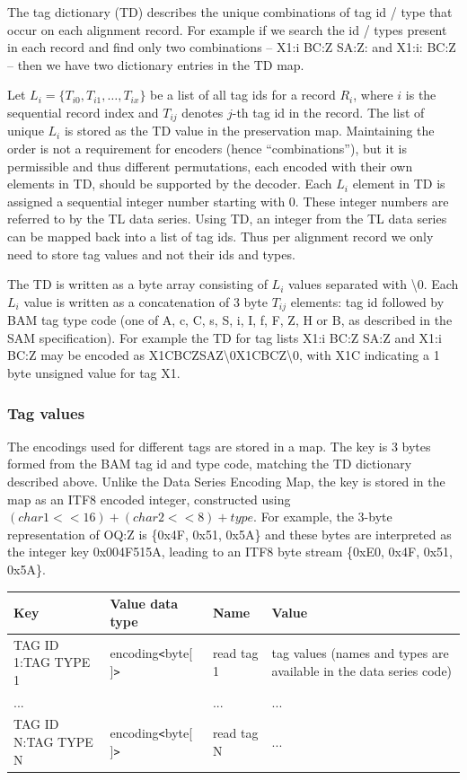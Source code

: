 \documentclass[a4paper]{article}
\begin{document}
The tag dictionary (TD) describes the unique combinations of tag id / type that occur on each alignment record.
For example if we search the id / types present in each record and find only two combinations -- X1:i BC:Z SA:Z: and X1:i: BC:Z -- then we have two dictionary entries in the TD map.

Let $L_{i}=\{T_{i0}, T_{i1}, \ldots, T_{ix}\}$ be a list of all tag ids for a record $R_{i}$, where $i$ is the sequential record index and $T_{ij}$ denotes $j$-th tag id in the record.
The list of unique $L_{i}$ is stored as the TD value in the preservation map.
Maintaining the order is not a requirement for encoders (hence ``combinations''), but it is permissible and thus different permutations, each encoded with their own elements in TD, should be supported by the decoder.
Each $L_{i}$ element in TD is assigned a sequential integer number starting with 0.
These integer numbers are referred to by the TL data series.
Using TD, an integer from the TL data series can be mapped back into a list of tag ids.
Thus per alignment record we only need to store tag values and not their ids and types.

The TD is written as a byte array consisting of $L_{i}$ values separated with \textbackslash{}0.
Each $L_{i}$ value is written as a concatenation of 3 byte $T_{ij}$ elements: tag id followed by BAM tag type code (one of A, c, C, s, S, i, I, f, F, Z, H or B, as described in the SAM specification).
For example the TD for tag lists X1:i BC:Z SA:Z and X1:i BC:Z may be encoded as X1CBCZSAZ\textbackslash{}0X1CBCZ\textbackslash{}0, with X1C indicating a 1 byte unsigned value for tag X1.

\subsubsection*{Tag values}

The encodings used for different tags are stored in a map.
The key is 3 bytes formed from the BAM tag id and type code, matching the TD dictionary described above.
Unlike the Data Series Encoding Map, the key is stored in the map as an ITF8 encoded integer, constructed using $(char1<<16) + (char2<<8) + type$.
For example, the 3-byte representation of OQ:Z is \{0x4F, 0x51, 0x5A\} and these bytes are interpreted as the integer key 0x004F515A, leading to an ITF8 byte stream \{0xE0, 0x4F, 0x51, 0x5A\}.

\begin{tabular}{|l|l|l|>{\raggedright}p{160pt}|}
\hline
\textbf{Key} & \textbf{Value data type} & \textbf{Name} & \textbf{Value}
\tabularnewline
\hline
TAG ID 1:TAG TYPE 1 & encoding\texttt{<}byte[ ]\texttt{>} & read tag 1 & tag values
(names and types are available in the data series code)\tabularnewline
\hline
... &  & ... & ...\tabularnewline
\hline
TAG ID N:TAG TYPE N & encoding\texttt{<}byte[ ]\texttt{>} & read tag N & ...\tabularnewline
\hline
\end{tabular}
\end{document}
